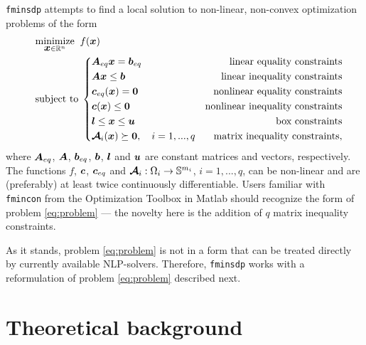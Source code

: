 \documentclass{article}
\newcommand{\bm}[1]{\mbox{\boldmath $#1$}}
\begin{document}
\texttt{fminsdp} attempts to find a local solution to non-linear, non-convex optimization problems of the form
\begin{equation}\label{eq:problem}
\quad
	\begin{aligned}
	&	\underset{\bm{x}\in\mathbb{R}^{n}}{\mbox{minimize}} \;\; f(\bm{x})  \\
	&	\mbox{subject to} \;
	\left\{
		\begin{aligned}
			& \bm{A}_{eq}\bm{x} = \bm{b}_{eq} & \mbox{linear equality constraints}      \\
			& \bm{A}\bm{x} \leq \bm{b}	      & \mbox{linear inequality constraints} \\
			& \bm{c}_{eq}(\bm{x}) = \bm{0}	 	& \mbox{nonlinear equality constraints}			\\		
		  & \bm{c}(\bm{x}) \leq \bm{0}			& \mbox{nonlinear inequality constraints}  \\			
			& \bm{l} \leq \bm{x} \leq \bm{u}	& \mbox{box constraints}\\
			& \bm{\mathcal{A}}_{i}(\bm{x}) \succeq \bm{0}, \quad i = 1,...,q & \mbox{matrix inequality constraints},
		\end{aligned}
		\right.
	\end{aligned}
\end{equation}
\vskip 2mm
\noindent where $\bm{A}_{eq}$, $\bm{A}$, $\bm{b}_{eq}$, $\bm{b}$, $\bm{l}$ and $\bm{u}$ are constant matrices and vectors, respectively. The functions $f$, $\bm{c}$,  $\bm{c}_{eq}$ and $\bm{\mathcal{A}}_{i}:\Omega_{i} \rightarrow \mathbb{S}^{m_{i}}$, $i = 1,...,q$, can be non-linear and are (preferably) at least 
twice continuously differentiable. Users familiar with \texttt{fmincon} from the Optimization Toolbox in Matlab \cite{fmincon:60} should recognize the 
form of problem \eqref{eq:problem} --- the novelty here is the addition of $q$ matrix inequality constraints. 

As it stands, problem \eqref{eq:problem} is not in a form that can be treated directly by currently available NLP-solvers. Therefore, \texttt{fminsdp} works with a reformulation of problem \eqref{eq:problem} described next.



\section{Theoretical background}
\end{document}
